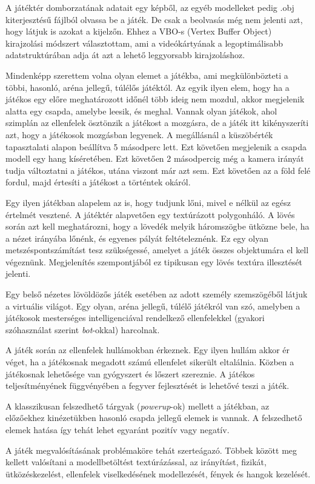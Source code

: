 
A játéktér domborzatának adatait egy képből, az egyéb modelleket pedig .obj kiterjesztésű fájlból olvassa be a játék. De csak a beolvasás még nem jelenti azt, hogy látjuk is azokat a kijelzőn. Ehhez a VBO-s (Vertex Buffer Object) kirajzolási módszert választottam, ami a videókártyának a legoptimálisabb adatstruktúrában adja át azt a lehető leggyorsabb kirajzoláshoz.


Mindenképp szerettem volna olyan elemet a játékba, ami megkülönbözteti a többi, hasonló, aréna jellegű, túlélős játéktól. Az egyik ilyen elem, hogy ha a játékos egy előre meghatározott időnél több ideig nem mozdul, akkor megjelenik alatta egy csapda, amelybe leesik, és meghal. Vannak olyan játékok, ahol szimplán az ellenfelek ösztönzik a játékost a mozgásra, de a játék itt kikényszeríti azt, hogy a játékosok mozgásban legyenek. A megállásnál a küszöbérték tapasztalati alapon beállítva 5 másodperc lett. Ezt követően megjelenik a csapda modell egy hang kíséretében. Ezt követően 2 másodpercig még a kamera irányát tudja változtatni a játékos, utána viszont már azt sem. Ezt követően az a föld felé fordul, majd értesíti a játékost a történtek okáról.


Egy ilyen játékban alapelem az is, hogy tudjunk lőni, mivel e nélkül az egész értelmét vesztené. A játéktér alapvetően egy textúrázott polygonháló. A lövés során azt kell meghatározni, hogy a lövedék melyik háromszögbe ütközne bele, ha a nézet irányába lőnénk, és egyenes pályát feltételeznénk. Ez egy olyan metszéspontszámítást tesz szükségessé, amelyet a játék összes objektumára el kell végeznünk. Megjelenítés szempontjából ez tipikusan egy lövés textúra illesztését jelenti.


Egy belső nézetes lövöldözős játék esetében az adott személy szemszögéből látjuk a virtuális világot. Egy olyan, aréna jellegű, túlélő játékról van szó, amelyben a játékosok mesterséges intelligenciával rendelkező ellenfelekkel (gyakori szóhasználat szerint \textit{bot}-okkal) harcolnak.

A játék során az ellenfelek hullámokban érkeznek. Egy ilyen hullám akkor ér véget, ha a játékosnak megadott számú ellenfelet sikerült eltalálnia. Közben a játékosnak lehetősége van gyógyszert és lőszert szereznie. A játékos teljesítményének függvényében a fegyver fejlesztését is lehetővé teszi a játék.

A klasszikusan felszedhető tárgyak (\textit{powerup}-ok) mellett a játékban, az előzőekhez kinézetükben hasonló csapda jellegű elemek is vannak. A felszedhető elemek hatása így tehát lehet egyaránt pozitív vagy negatív.

A játék megvalósításának problémaköre tehát szerteágazó. Többek között meg kellett valósítani a modellbetöltést textúrázással, az irányítást, fizikát, ütközéskezelést, ellenfelek viselkedésének modellezését, fények és hangok kezelését.

